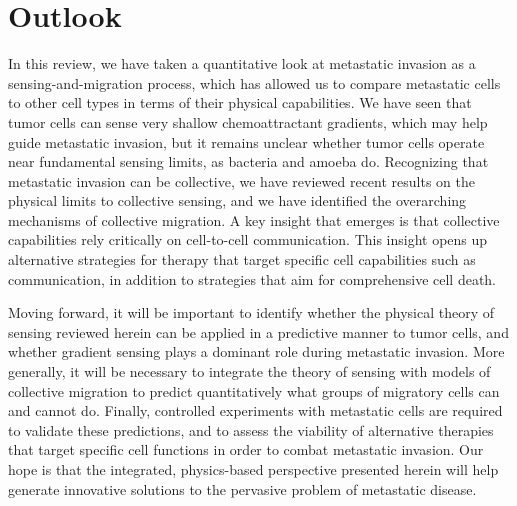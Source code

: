 %


\section{Outlook}

In this review, we have taken a quantitative look at metastatic invasion as a sensing-and-migration process, which has allowed us to compare metastatic cells to other cell types in terms of their physical capabilities. We have seen that tumor cells can sense very shallow chemoattractant gradients, which may help guide metastatic invasion, but it remains unclear whether tumor cells  operate near fundamental sensing limits, as bacteria and amoeba do. Recognizing that metastatic invasion can be collective, we have reviewed recent results on the physical limits to collective sensing, and we have identified the overarching mechanisms of collective migration. A key insight that emerges is that collective capabilities rely critically on cell-to-cell communication. This insight opens up alternative strategies for therapy that target specific cell capabilities such as communication, in addition to strategies that aim for comprehensive cell death.

Moving forward, it will be important to identify whether the physical theory of sensing reviewed herein can be applied in a predictive manner to tumor cells, and whether gradient sensing plays a dominant role during metastatic invasion. More generally, it will be necessary to integrate the theory of sensing with models of collective migration to predict quantitatively what groups of migratory cells can and cannot do. Finally, controlled experiments with metastatic cells are required to validate these predictions, and to assess the viability of alternative therapies that target specific cell functions in order to combat metastatic invasion. Our hope is that the integrated, physics-based perspective presented herein will help generate innovative solutions to the pervasive problem of metastatic disease.
